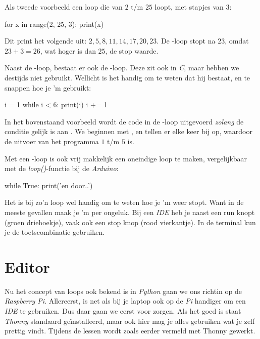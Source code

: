 Als tweede voorbeeld een loop die van $2$ t/m $25$ loopt, met stapjes van $3$:
\begin{python}
for x in range(2, 25, 3):
	print(x)
\end{python}
Dit print het volgende uit: $2, 5, 8, 11, 14, 17, 20, 23$. De -loop stopt na $23$, omdat $23+3 = 26$, wat hoger is dan $25$, de stop waarde. 

Naast de -loop, bestaat er ook de -loop. Deze zit ook in \textit{C}, maar hebben we destijds niet gebruikt. Wellicht is het handig om te weten dat hij bestaat, en te snappen hoe je 'm gebruikt:
\begin{python}
i = 1
while i < 6:
	print(i)
	i += 1
\end{python}
In het bovenstaand voorbeeld wordt de code in de -loop uitgevoerd \textit{zolang} de conditie  gelijk is aan . We beginnen met , en tellen er elke keer  bij op, waardoor de uitvoer van het programma $1$ t/m $5$ is. 

Met een -loop is ook vrij makkelijk een oneindige loop te maken, vergelijkbaar met de \textit{loop()}-functie bij de \textit{Arduino}:
\begin{python}
while True:
	print('en door..')
\end{python}

\begin{remark}
Het is bij zo'n loop wel handig om te weten hoe je 'm weer stopt. Want in de meeste gevallen maak je 'm per ongeluk. Bij een \textit{IDE} heb je naast een run knopt (groen driehoekje), vaak ook een stop knop (rood vierkantje). In de terminal kun je de toetscombinatie  gebruiken. 
\end{remark}

\newpage

\section{Editor}
Nu het concept van loops ook bekend is in \textit{Python} gaan we ons richtin op de \textit{Raspberry Pi}. Allereerst, is net als bij je laptop ook op de \textit{Pi} handiger om een \textit{IDE} te gebruiken. Dus daar gaan we eerst voor zorgen. Als het goed is staat \textit{Thonny} standaard geïnstalleerd, maar ook hier mag je alles gebruiken wat je zelf prettig vindt. Tijdens de lessen wordt zoals eerder vermeld met Thonny gewerkt. 


